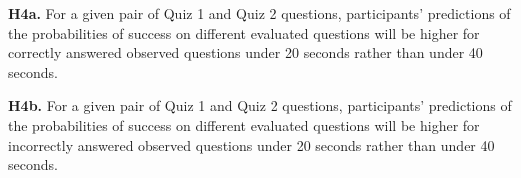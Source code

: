 \documentclass[10pt,letterpaper]{article}
\begin{document}
\textbf{H4a.} For a given pair of Quiz 1 and Quiz 2 questions, participants’ predictions of the probabilities of success on different evaluated questions will be higher for correctly answered observed questions under 20 seconds rather than under 40 seconds.

\textbf{H4b.} For a given pair of Quiz 1 and Quiz 2 questions, participants’ predictions of the probabilities of success on different evaluated questions will be higher for incorrectly answered observed questions under 20 seconds rather than under 40 seconds.




\end{document}
